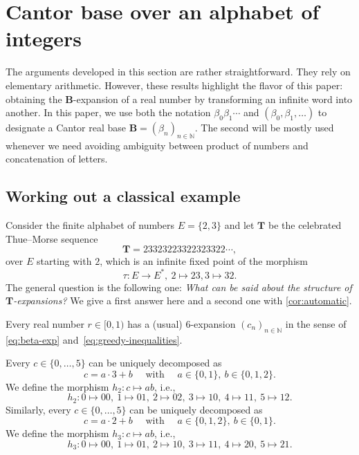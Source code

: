 \documentclass[12pt,reqno]{amsart}
\newcommand{\B}{{\mathbf{B}}}
\begin{document}

\section{Cantor base over an alphabet of integers} \label{sec:Cantorbaseintegers}

The arguments developed in this section are rather straightforward. They rely on elementary arithmetic. However, these results highlight the flavor of this paper: obtaining the $\B$-expansion of a real number by transforming an infinite word into another. In this paper, we use both the notation $\beta_0\beta_1\cdots$ and $(\beta_0,\beta_1,\ldots)$ to designate a Cantor real base $\B=(\beta_n)_{n\in\mathbb{N}}$. The second will be mostly used whenever we need avoiding ambiguity between product of numbers and concatenation of letters.

\subsection{Working out a classical example} 
Consider the finite alphabet of numbers $E=\{2,3\}$ and let ${\mathbf{T}}$ be the celebrated Thue--Morse sequence
\begin{equation*}
    {\mathbf{T}}=23323223322323322\cdots,    
\end{equation*}
over $E$ starting with $2$, which is an infinite fixed point of the morphism 
\begin{equation}
\label{eq:TM-morphism}
    \tau\colon E\to E^*,\ 2\mapsto 23, 3\mapsto 32.
\end{equation} 
The general question is the following one: {\em What can be said about the structure of ${\mathbf{T}}$-expansions?} We give a first answer here and a second one with \cref{cor:automatic}. 

Every real number $r\in[0,1)$ has a (usual) $6$-expansion $(c_n)_{n\in\mathbb{N}}$ in the sense of \eqref{eq:beta-exp} and~\eqref{eq:greedy-inequalities}. 

\begin{definition}
\label{def:h2h3}
Every $c\in\{0,\ldots,5\}$ can be uniquely decomposed as
\[c=a\cdot 3+b\quad \text{ with }\quad a\in\{0,1\},\ b\in\{0,1,2\}.\]
We define the morphism $h_2:c\mapsto ab$, i.e.,
\[h_2\colon 0\mapsto 00,\ 1\mapsto 01,\ 2\mapsto 02,\ 3\mapsto 10,\ 4\mapsto 11,\ 5\mapsto 12.\]
Similarly, every $c\in\{0,\ldots,5\}$ can be uniquely decomposed as
\[c=a \cdot 2+b\quad \text{ with }\quad a\in\{0,1,2\},\ b\in\{0,1\}.\]
We define the morphism $h_3:c\mapsto ab$, i.e.,
\[h_3\colon 0\mapsto 00,\ 1\mapsto 01,\ 2\mapsto 10,\ 3\mapsto 11,\ 4\mapsto 20,\ 5\mapsto 21.\]
\end{definition}
\end{document}
